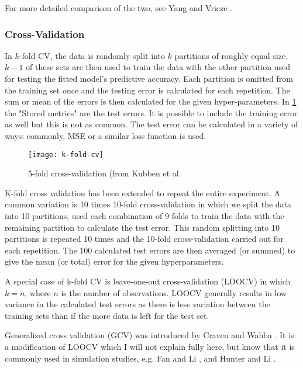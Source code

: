 For more detailed comparison of the two, see Yang  and Vrieze .

\subsubsection{Cross-Validation}

In $k$-fold CV, the data is randomly split into $k$ partitions of roughly equal size. $k-1$ of these sets are then used to train the data with the other partition used for testing the fitted model's predictive accuracy. Each partition is omitted from the training set once and the testing error is calculated for each repetition. The sum or mean of the errors is then calculated for the given hyper-parameters. In \cref{fig:k-fold-cv} the "Stored metrics" are the test errors. It is possible to include the training error as well but this is not as common. The test error can be calculated in a variety of ways: commonly, MSE or a similar loss function is used.

\begin{figure}[h!]
  \texttt{[image: k-fold-cv]}
  \caption{5-fold cross-validation (from Kubben et al }
  \label{fig:k-fold-cv}
\end{figure}

K-fold cross validation has been extended to repeat the entire experiment. A common variation is 10 times 10-fold cross-validation in which we split the data into 10 partitions, used each combination of 9 folds to train the data with the remaining partition to calculate the test error. This random splitting into 10 partitions is repeated 10 times and the 10-fold cross-validation carried out for each repetition. The 100 calculated test errors are then averaged (or summed) to give the mean (or total) error for the given hyperparameters.

A special case of k-fold CV is leave-one-out cross-validation (LOOCV) in which $k=n$, where $n$ is the number of observations. LOOCV generally results in low variance in the calculated test errors as there is less variation between the training sets than if the more data is left for the test set.

Generalized cross validation (GCV) was introduced by Craven and Wahba . It is a modification of LOOCV which I will not explain fully here, but know that it is commonly used in simulation studies, e.g. Fan and Li , and Hunter and Li .

